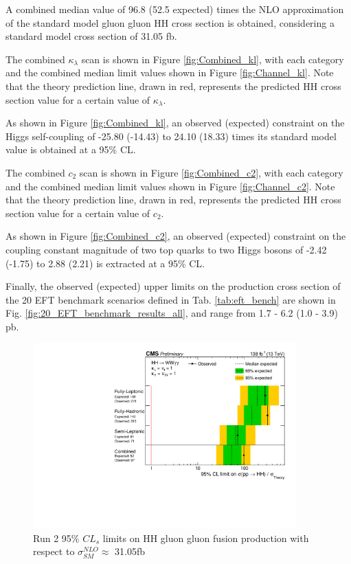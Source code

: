 A combined median value of 96.8 (52.5 expected) times the NLO approximation of the standard model gluon gluon HH cross section is obtained, considering a standard model cross section of 31.05 fb. 

The combined $\kappa_{\lambda}$ scan is shown in Figure \ref{fig:Combined_kl}, with each category and the combined median limit values shown
in Figure \ref{fig:Channel_kl}. Note that the theory prediction line, drawn in red, represents the predicted HH cross section value for a certain value of $\kappa_{\lambda}$.

As shown in Figure \ref{fig:Combined_kl}, an observed (expected) constraint on the Higgs self-coupling of -25.80 (-14.43) to 24.10 (18.33) times its standard model value 
is obtained at a 95\% CL. 

The combined $c_{2}$ scan is shown in Figure \ref{fig:Combined_c2}, with each category and the combined median limit values shown
in Figure \ref{fig:Channel_c2}. Note that the theory prediction line, drawn in red, represents the predicted HH cross section value for a certain value of $c_{2}$.

As shown in Figure \ref{fig:Combined_c2}, an observed (expected) constraint on the coupling constant magnitude of two top quarks to two Higgs bosons of
-2.42 (-1.75) to 2.88 (2.21) is extracted at a 95\% CL.

Finally, the observed (expected) upper limits on the production cross section of the 20 EFT benchmark scenarios defined in Tab. \ref{tab:eft_bench} are shown in 
Fig. \ref{fig:20_EFT_benchmark_results_all}, and range from 1.7 - 6.2 (1.0 - 3.9) pb. 

\begin{figure}[!htbp]
  \centering
  \includegraphics[width=0.9\textwidth]{Images/Results/All_limits.pdf}
  \caption{Run 2 95\% $CL_{s}$ limits on HH gluon gluon fusion production with respect to $\sigma_{SM}^{NLO} \approx $ 31.05fb}
  \label{fig:Run2SMNLOCombined}
\end{figure}

